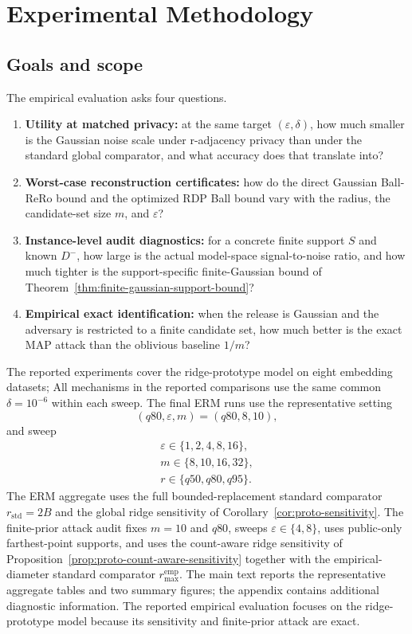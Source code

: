 \documentclass[conference,compsoc]{IEEEtran}
\begin{document}
\section{Experimental Methodology}
\label{sec:experiments}

\subsection{Goals and scope}
The empirical evaluation asks four questions.
\begin{enumerate}[leftmargin=1.5em]
    \item \textbf{Utility at matched privacy:} at the same target $(\varepsilon,\delta)$, how much smaller is the Gaussian noise scale under r-adjacency privacy than under the standard global comparator, and what accuracy does that translate into?
    \item \textbf{Worst-case reconstruction certificates:} how do the direct Gaussian Ball-ReRo bound and the optimized RDP Ball bound vary with the radius, the candidate-set size $m$, and $\varepsilon$?
    \item \textbf{Instance-level audit diagnostics:} for a concrete finite support $S$ and known $D^-$, how large is the actual model-space signal-to-noise ratio, and how much tighter is the support-specific finite-Gaussian bound of Theorem~\ref{thm:finite-gaussian-support-bound}?
    \item \textbf{Empirical exact identification:} when the release is Gaussian and the adversary is restricted to a finite candidate set, how much better is the exact MAP attack than the oblivious baseline $1/m$?
\end{enumerate}

The reported experiments cover the ridge-prototype model on eight embedding datasets; All mechanisms in the reported comparisons use the same common $\delta=10^{-6}$ within each sweep. The final ERM runs use the representative setting
\[
(q80,\varepsilon,m)=(q80,8,10),
\]
and sweep
\[
\begin{gathered}
\varepsilon\in\{1,2,4,8,16\},\\
m\in\{8,10,16,32\},\\
r\in\{q50,q80,q95\}.
\end{gathered}
\]
The ERM aggregate uses the full bounded-replacement standard comparator $r_{\mathrm{std}}=2B$ and the global ridge sensitivity of Corollary~\ref{cor:proto-sensitivity}. The finite-prior attack audit fixes $m=10$ and $q80$, sweeps $\varepsilon\in\{4,8\}$, uses public-only farthest-point supports, and uses the count-aware ridge sensitivity of Proposition~\ref{prop:proto-count-aware-sensitivity} together with the empirical-diameter standard comparator $r_{\max}^{\mathrm{emp}}$. The main text reports the representative aggregate tables and two summary figures; the appendix contains additional diagnostic information. The reported empirical evaluation focuses on the ridge-prototype model because its sensitivity and finite-prior attack are exact.
\end{document}
